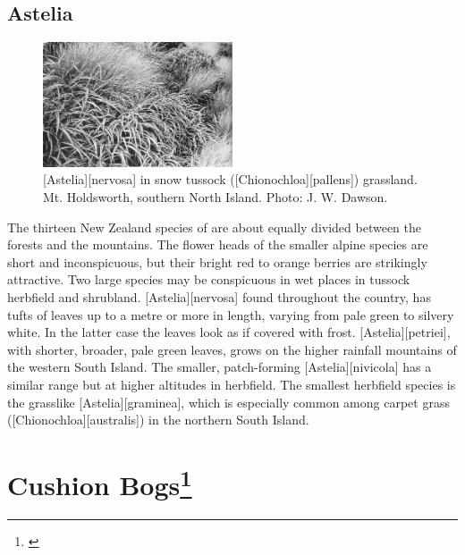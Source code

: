 \subsection{Astelia}

\begin{figure}
	\includegraphics[width=0.5\textwidth]{graphics/figure103astelia.jpg}
	\centering
	\caption[\emph{Astelia nervosa} in snow tussock]{[Astelia][nervosa] in snow tussock ([Chionochloa][pallens]) grassland.
	Mt. Holdsworth, southern North Island.
	Photo: J. W. Dawson.}%
	\label{fig:103astelia}
\end{figure}

The thirteen New Zealand species of  are about equally divided between the forests and the mountains.
The flower heads of the smaller alpine species are short and inconspicuous, but their bright red to orange berries are strikingly attractive.
Two large species may be conspicuous in wet places in tussock herbfield and shrubland. [Astelia][nervosa] found throughout the country, has tufts of leaves up to a metre or more in length, varying from pale green to silvery white.
In the latter case the leaves look as if covered with frost. [Astelia][petriei], with shorter, broader, pale green leaves, grows on the higher rainfall mountains of the western South Island.
The smaller, patch-forming [Astelia][nivicola] has a similar range but at higher altitudes in herbfield.
The smallest herbfield species is the grasslike [Astelia][graminea], which is especially common among carpet grass ([Chionochloa][australis]) in the northern South Island.

\section[Cushion Bogs]{Cushion Bogs\footnote{\cite{gibson1985comparison}}}

